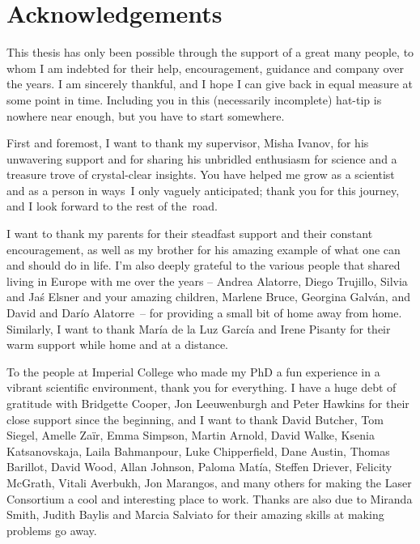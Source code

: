 
\chapter*{Acknowledgements}
\vspace{0cm}
\noindent

\newlength{\ackskip}
\setlength{\ackskip}{8pt}


\noindent
This thesis has only been possible through the support of a great many people, to whom I am indebted for their help, encouragement, guidance and company over the years. I am sincerely thankful, and I hope I can give back in equal measure at some point in time. Including you in this (necessarily incomplete) hat-tip is nowhere near enough, but you have to start somewhere.

\vspace{\ackskip}
\noindent
First and foremost, I want to thank my supervisor, Misha Ivanov, for his unwavering support and for sharing his unbridled enthusiasm for science and a treasure trove of crystal-clear insights. You have helped me grow as a scientist and as a person in ways~I only vaguely anticipated; thank you for this journey, and I look forward to the rest of the~road.

\vspace{\ackskip}
\noindent
I want to thank my parents for their steadfast support and their constant encouragement, as well as my brother for his amazing example of what one can and should do in life. I'm also deeply grateful to the various people that shared living in Europe with me over the years -- Andrea Alatorre, Diego Trujillo, Silvia and Ja\'s Elsner and your amazing children, Marlene Bruce, Georgina Galván, and David and Darío Alatorre~-- for providing a small bit of home away from home. Similarly, I want to thank María de la Luz García and Irene Pisanty for their warm support while home and at a distance.


\vspace{\ackskip}
\noindent
To the people at Imperial College who made my PhD a fun experience in a vibrant scientific environment, thank you for everything. I have a huge debt of gratitude with Bridgette Cooper, Jon Leeuwenburgh and Peter Hawkins for their close support since the beginning, and I want to thank David Butcher, Tom Siegel, Amelle Za\"ir, Emma Simpson, Martin Arnold, David Walke, Ksenia Katsanovskaja, Laila Bahmanpour, Luke Chipperfield, Dane Austin, Thomas Barillot, David Wood, Allan Johnson, Paloma Matía, Steffen Driever, Felicity McGrath, Vitali Averbukh, Jon Marangos, and many others for making the Laser Consortium a cool and interesting place to work. Thanks are also due to Miranda Smith, Judith Baylis and Marcia Salviato for their amazing skills at making problems go away.

